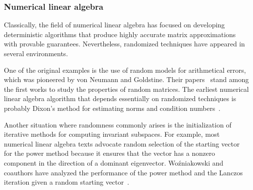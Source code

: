 \documentclass[final]{siamltex}
\newcounter{algorithm}[section]
\newcommand{\pgnotate}[1]{{\color{blue}[#1]}}
\newcommand{\notate}[1]{\textcolor{red}{\textbf{[#1]}}}
\begin{document}



\subsubsection{Numerical linear algebra}

Classically, the field of numerical linear algebra has focused on
developing deterministic algorithms that produce highly accurate
matrix approximations with provable guarantees. Nevertheless,
randomized techniques have appeared in several environments.

One of the original examples is the use of
random models for arithmetical errors, which was pioneered by von Neumann
and Goldstine.
Their papers~\cite{NG47:Numerical-Inverting,NG51:Numerical-Inverting-II} stand among the first works
to study the properties of random matrices.
The earliest numerical linear algebra algorithm that
depends essentially on randomized techniques is probably Dixon's
method for estimating norms and condition
numbers~\cite{Dix83:Estimating-Extremal}.

Another situation where randomness commonly arises is the initialization of
iterative methods for computing invariant subspaces.  For example,
most numerical linear algebra texts advocate random selection of the
starting vector for the power method because it ensures that the
vector has a nonzero component in the direction of a dominant
eigenvector.  Wo{\' z}niakowski and coauthors have analyzed the
performance of the power method and the Lanczos iteration given a
random starting
vector~\cite{KW92:Estimating-Largest,LW98:Estimating-Largest}.
\end{document}
